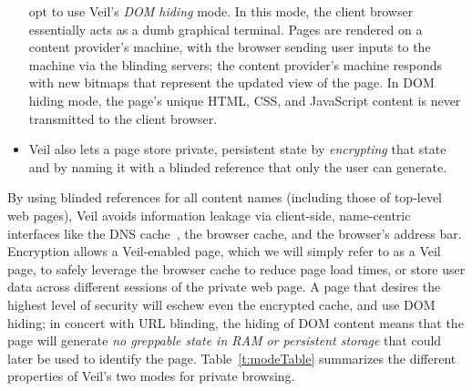 \begin{itemize}
	opt to use Veil's \emph{DOM hiding} mode. In this
	mode, the client browser essentially acts as a dumb
	graphical terminal. Pages are rendered on a content
	provider's machine, with the browser sending user inputs
	to the machine via the blinding servers; the content
	provider's machine responds with new bitmaps that
	represent the updated view of the page. In DOM hiding
	mode, the page's unique HTML, CSS, and JavaScript content
	is never transmitted to the client browser.
	\item Veil also lets a page store private, persistent
	state by \emph{encrypting} that state and by naming
	it with a blinded reference that only the user can
	generate.
\end{itemize}
By using blinded references for all content names (including
those of top-level web pages), Veil avoids information leakage
via client-side, name-centric interfaces like the
DNS cache~\cite{timingAttacks}, the browser cache, and
the browser's address bar.
Encryption allows a Veil-enabled page, which we will simply
refer to as a Veil page, to safely leverage the
browser cache to reduce page load times, or store user data
across different sessions of the private web page. A page
that desires the highest level of security will eschew even
the encrypted cache, and use DOM hiding; in concert with URL
blinding, the hiding of DOM content means that the page will
generate \emph{no greppable state in RAM or persistent storage}
that could later be used to identify the page. Table~\ref{t:modeTable}
summarizes the different properties of Veil's two modes for
private browsing.

